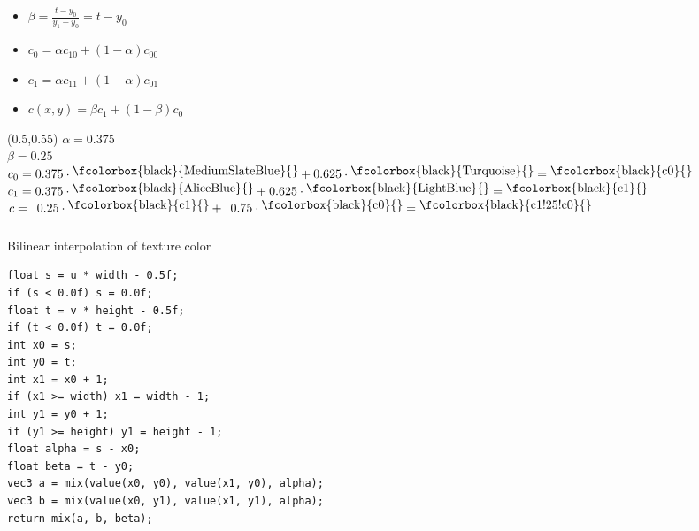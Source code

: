 \documentclass[utf8,stillsansserifmath,fleqn,t]{beamer}
\begin{document}
\begin{frame}[label=texture-bilin]
\begin{textblock}{.4}
\begin{itemize}
\item $\displaystyle \beta = \frac{t-y_0}{y_1-y_0}=t-y_0$
\item $c_0 = \alpha c_{10}+(1-\alpha)c_{00}$
\item $c_1 = \alpha c_{11}+(1-\alpha)c_{01}$
\item $c(x,y) = \beta c_1  + (1-\beta) c_0$
\end{itemize}
\end{textblock}
\begin{textblock}{.4}(0.5,0.55)
$\alpha = 0.375$\\
$\beta = 0.25$\\
$c_0 = 0.375\cdot\raisebox{0.6ex}{\fcolorbox{black}{MediumSlateBlue}{}}
    + 0.625\cdot\raisebox{0.6ex}{\fcolorbox{black}{Turquoise}{}}
    = \raisebox{0.6ex}{\fcolorbox{black}{c0}{}}$
$c_1 = 0.375\cdot\raisebox{0.6ex}{\fcolorbox{black}{AliceBlue}{}}
    + 0.625\cdot\raisebox{0.6ex}{\fcolorbox{black}{LightBlue}{}}
    = \raisebox{0.6ex}{\fcolorbox{black}{c1}{}}$
\hspace*{.65ex}$c = \hphantom{0}0.25\cdot\raisebox{0.6ex}{\fcolorbox{black}{c1}{}}
    + \hphantom{0}0.75\cdot\raisebox{0.6ex}{\fcolorbox{black}{c0}{}}
    = \raisebox{0.6ex}{\fcolorbox{black}{c1!25!c0}{}}$
\end{textblock}
\end{frame}

\begin{frame}[fragile]
\frametitle{\insertsection}
Bilinear interpolation of texture color
\begin{lstlisting}
float s = u * width - 0.5f;
if (s < 0.0f) s = 0.0f;
float t = v * height - 0.5f;
if (t < 0.0f) t = 0.0f;
int x0 = s;
int y0 = t;
int x1 = x0 + 1;
if (x1 >= width) x1 = width - 1;
int y1 = y0 + 1;
if (y1 >= height) y1 = height - 1;
float alpha = s - x0;
float beta = t - y0;
vec3 a = mix(value(x0, y0), value(x1, y0), alpha);
vec3 b = mix(value(x0, y1), value(x1, y1), alpha);
return mix(a, b, beta);
\end{lstlisting}
\end{frame}
\end{document}
